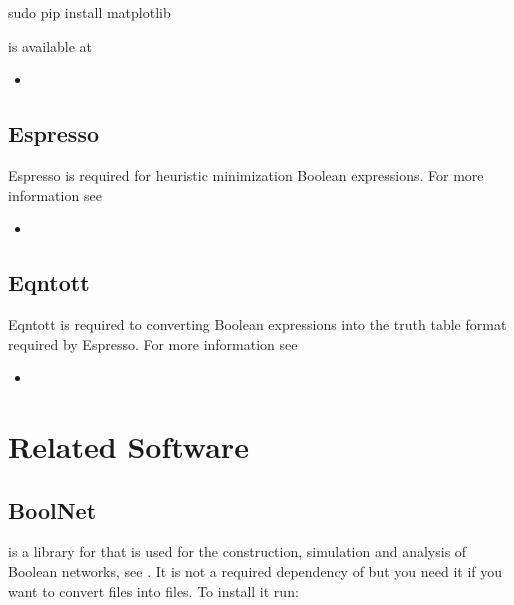 \documentclass[letterpaper,10pt,english]{sphinxmanual}
\begin{document}
\begin{sphinxVerbatim}[commandchars=\\\{\}]
\PYGZdl{} sudo pip install matplotlib
\end{sphinxVerbatim}

 is available at
\begin{itemize}
\item {} 

\end{itemize}


\subsection{Espresso}
\label{\detokenize{Installation:espresso}}\label{\detokenize{Installation:installation-espresso}}
Espresso is required for heuristic minimization Boolean expressions.
For more information see
\begin{itemize}
\item {} 

\end{itemize}


\subsection{Eqntott}
\label{\detokenize{Installation:eqntott}}\label{\detokenize{Installation:installation-eqntott}}
Eqntott is required to converting Boolean expressions into the truth table format required by Espresso.
For more information see
\begin{itemize}
\item {} 

\end{itemize}


\section{Related Software}
\label{\detokenize{Installation:related-software}}

\subsection{BoolNet}
\label{\detokenize{Installation:boolnet}}\label{\detokenize{Installation:installation-boolnet}}
 is a library for  that is used for the construction, simulation and analysis of Boolean networks, see {\hyperref[\detokenize{Bibliography:mussel2010}]{}}.
It is not a required dependency of  but you need it if you want to convert  files into  files.
To install it run:
\end{document}
